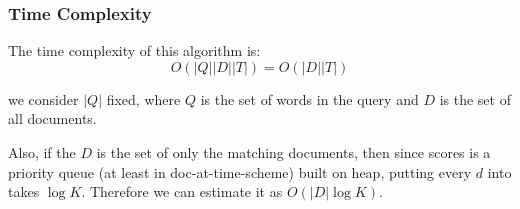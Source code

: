 \subsubsection{Time Complexity}

The time complexity of this algorithm is:
\begin{equation}
    O(|Q| |D| |T|) = O(|D| |T|)
\end{equation}

we consider $|Q|$ fixed, where $Q$ is the set of words in the query and $D$ is the set of all documents.

Also, if the $D$ is the set of only the matching documents, then
since scores is a priority queue (at least in doc-at-time-scheme) built on heap, 
putting every $d$ into takes $\log K$. Therefore we can estimate it as $O(|D| \log K )$.
